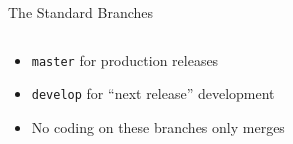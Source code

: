 \documentclass[
14pt,
aspectratio=169,
usenames,
dvipsnames,
x11names]{beamer}
\newcommand{\shadowbox}[2]{%
  \hbox{%
    \begin{tcolorbox}[beamer,
      width=#1,
      drop fuzzy shadow=black,
      arc=0pt,
      boxsep=0pt,
      left=0pt,right=0pt,top=0pt,bottom=0pt,
      ]%
      #2
    \end{tcolorbox}
  }
}
\begin{document}
\begin{frame}{The Standard Branches}
  \begin{columns}
    \begin{column}{.65\linewidth}
      \minipage[c][0.5\textheight][s]{\columnwidth}
      \begin{itemize} \setlength{\itemsep}{\fill}
      \item \alert{\texttt{master}} for production releases
      \item \alert{\texttt{develop}} for ``next release'' development
      \item \alert{No coding} on these branches \alert{only merges}
      \end{itemize}
      \endminipage
    \end{column}
  \end{columns}
\end{frame}
\end{document}
